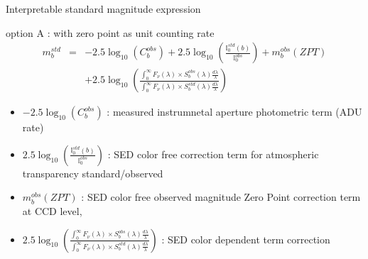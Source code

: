 \documentclass{beamer}
\begin{document}
\begin{frame}{Interpretable standard magnitude expression}
\begin{alertblock}{option A : with zero point as unit counting rate}
\begin{eqnarray}
m_b^{std} & = &  -2.5 \log_{10}(C_b^{obs})+ 2.5 \log_{10}\left(\frac{\mathbb{I}_0^{std}(b)}{\mathbb{I}_0^{obs}}\right) + m_b^{obs}(ZPT)   \nonumber \\
 & & + 2.5 \log_{10} 
	\left( 
	\frac{\int_0^\infty F_\nu(\lambda) \times S_b^{obs}(\lambda) \frac{d\lambda}{\lambda} }{\int_0^\infty F_\nu(\lambda) \times S_b^{std}(\lambda) \frac{d\lambda}{\lambda}} 
	\right)
\end{eqnarray}
\end{alertblock}
\begin{itemize}
\item $-2.5 \log_{10}(C_b^{obs})$ : measured instrumnetal aperture photometric term (ADU rate)
\item $2.5 \log_{10}\left(\frac{\mathbb{I}_0^{std}(b)}{\mathbb{I}_0^{obs}}\right)$ : SED color free correction term for atmospheric transparency standard/observed
\item $m_b^{obs}(ZPT)$ :  SED color free observed magnitude Zero Point correction term at CCD level,
\item $2.5 \log_{10} 
	\left( 
	\frac{\int_0^\infty F_\nu(\lambda) \times S_b^{obs}(\lambda) \frac{d\lambda}{\lambda} }{\int_0^\infty F_\nu(\lambda) \times S_b^{std}(\lambda) \frac{d\lambda}{\lambda}}\right)$ : SED color dependent term correction
\end{itemize}
\end{frame}
\end{document}
